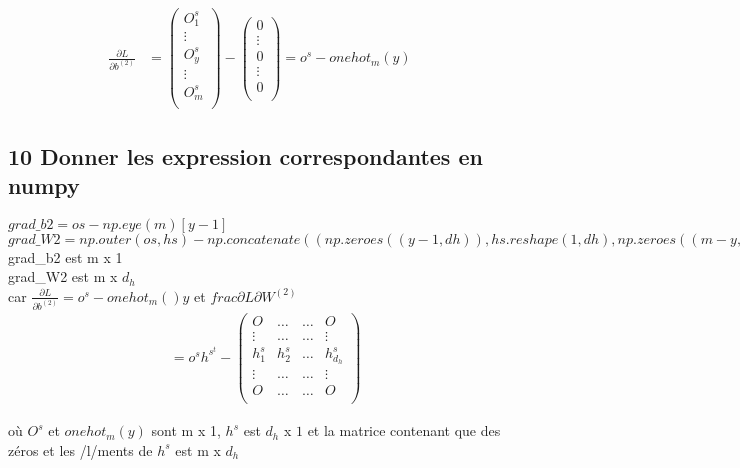 \documentclass[12pt]{article}
\begin{document}
\begin{align*} 
    \frac{\partial L}{\partial b^{(2)}}
&=
     \left(
       \begin{array}{r}
         O_1^s\\
        \vdots \\
         O_y^s\\
	\vdots\\
	O_m^s\\
       \end{array}
      \right)  - 
	\left(
     \begin{array}{r}
         0\\
        \vdots \\
         0\\
	\vdots\\
	0\\
       \end{array}
     \right)=o^s-onehot_m(y)
\end{align*}

 \subsection{10 Donner les expression correspondantes en numpy}
$grad\_b2 = os - np.eye(m)[y-1]$\\
$grad\_W2 = np.outer(os,hs)-np.concatenate((np.zeroes((y-1,dh)),hs.reshape(1,dh),np.zeroes((m-y,dh))))$\\

grad\_b2 est m x 1\\
grad\_W2 est m x $d_h$\\

car $\frac{\partial L}{\partial b^{(2)}} = o^s-onehot_m()y$ et $frac{\partial L}{\partial W^{(2)}}$ \\


\begin{align*} 
&= o^sh^{s^t} - 
	\left(
     \begin{array}{rrrr}
         O &   \dots &   \dots &   O\\
        \vdots &  \dots &   \dots&   \vdots \\
         h_1^s & h_2^s & \dots &h_{d_h}^s \\
 	\vdots &  \dots &   \dots&   \vdots \\
	O &   \dots &   \dots &   O\\
       \end{array}
     \right)
\end{align*}

où $O^s$ et $onehot_m(y)$ sont m x 1, $h^s$ est $d_h$ x $1$ et la matrice contenant que des zéros et les /l/ments de $h^s$ est m x $d_h$
\end{document}
